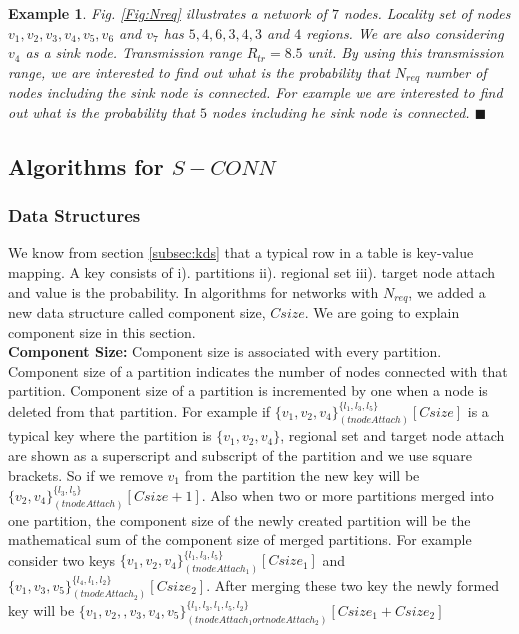 \documentclass[12pt]{article}
\newtheorem{exmp}{Example}[section]
\begin{document}
\begin{exmp}
\normalfont
Fig. \ref{Fig:Nreq} illustrates a network of $7$ nodes. Locality set of nodes $v_1,v_2,v_3,v_4,v_5,v_6$ and $v_7$ has $5,4,6,3,4,3$ and $4$ regions. We are also considering $v_4$ as a sink node. Transmission range \(R_{tr}=8.5\) unit. By using this transmission range, we are interested to find out what is the probability that $N_{req}$ number of nodes including the sink node is connected. For example we are interested to find out what is the probability that $5$ nodes including he sink node is connected. $\blacksquare$
\end{exmp}

\subsection{Algorithms for $S-CONN$}
\subsubsection{Data Structures}
We know from section \ref{subsec:kds} that a typical row in a table is key-value mapping. A key consists of 
i). partitions ii). regional set iii). target node attach and value is the probability. In algorithms for networks with $N_{req}$, we added a new data structure called component size, $Csize$. We are going to explain component size in this section.\\
\textbf{Component Size:} Component size is associated with every partition. Component size of a partition indicates the number of nodes connected with  that partition. Component size of a partition is incremented by one when a node is deleted from that partition. For example if ${\{v_1,v_2,v_4\}}^{\{l_1,l_3,l_5\}}_{(tnodeAttach)} [Csize]$ is a typical key where the partition is $\{v_1,v_2,v_4\}$, regional set and target node attach are shown as a superscript and subscript of the partition and we use square brackets. So if we remove   $v_1$ from the partition the new key will be ${\{v_2,v_4\}}^{\{l_3,l_5\}}_{(tnodeAttach)} [Csize+1]$.    Also when two or more partitions merged into one partition, the component size of the newly created partition will be the mathematical sum of the component size of merged partitions. For example consider two  keys ${\{v_1,v_2,v_4\}}^{\{l_1,l_3,l_5\}}_{(tnodeAttach_1)} [Csize_1]$ and ${\{v_1,v_3,v_5\}}^{\{l_4,l_1,l_2\}}_{(tnodeAttach_2)} [Csize_2]$. After merging these two key the newly formed key will be ${\{v_1,v_2,,v_3,v_4,v_5\}}^{\{l_1,l_3,l_1,l_5,l_2\}}_{(tnodeAttach_1 or tnodeAttach_2)} [Csize_1+Csize_2]$
\end{document}
